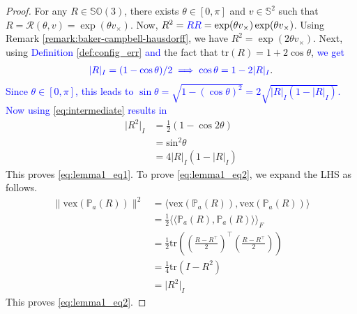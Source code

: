 \documentclass{article}
\newcommand{\SOthree}{\mathbb{SO}(3)}
\newcommand{\vex}[1]{\text{vex}\left(#1\right)}
\newcommand{\trace}[1]{\text{tr}\left(#1\right)}
\newcommand{\brackets}[1]{\left(#1\right)}
\newcommand{\textblue}[1]{\textcolor{blue}{#1}}
\newcommand{\normSOthree}[1]{{{\vert}#1 {\vert}_I}}
\newcommand{\cross}[1]{{#1}_\times}
\newcommand{\frobenius}[2]{\langle\langle #1, #2\rangle\rangle_F}
\newcommand{\inprod}[2]{\langle #1, #2 \rangle}
\begin{document}
\begin{proof}
    For any $R\in\SOthree$, there exists $\theta\in[0,\pi]$ and $v\in\mathbb{S}^2$ such that $R = \mathcal{R}(\theta, v) = \exp(\theta\cross{v})$. Now, $R^2 = \textblue{RR} = \exp(\theta \cross{v})\exp(\theta \cross{v})$. Using Remark \ref{remark:baker-campbell-hausdorff}, we have $R^2 = \exp(2\theta\cross{v})$. Next, using \textblue{Definition \ref{def:config_err} and} the fact that $\trace{R} = 1 + 2\cos\theta$, \textblue{we get} 
    \begin{align}\label{eq:intermediate}
        \textblue{\normSOthree{R} = (1 - \cos\theta)/2 \implies  \textblue{\cos\theta} = 1 - 2\normSOthree{R}}.
    \end{align}
   \textblue{ Since $\theta\in[0,\pi]$, this leads to  $\sin\theta =\sqrt{1-(\cos\theta)^2} = 2\sqrt{\normSOthree{R}\brackets{1 - \normSOthree{R}}}$. Now using \eqref{eq:intermediate} results in}
    \begin{align*}
        \normSOthree{R^2} &= \frac{1}{2}\brackets{1 - \cos{2\theta}} \\
        &= \text{sin}^2{\theta} \nonumber\\
        &= 4\normSOthree{R}\brackets{1 - \normSOthree{R}}
    \end{align*}
    This proves \eqref{eq:lemma1_eq1}. To prove \eqref{eq:lemma1_eq2}, we expand the LHS as follows. 
    \begin{align*}
        \|\vex{\mathbb{P}_a(R)}\|^2 &= \inprod{\vex{\mathbb{P}_a(R)}}{\vex{\mathbb{P}_a(R)}}\\
        &= \frac{1}{2}\frobenius{\mathbb{P}_a(R)}{\mathbb{P}_a(R)}\\
        &= \frac{1}{2}\trace{\brackets{\frac{R - R^\top}{2}}^\top\brackets{\frac{R - R^\top}{2}}}\\
        &= \frac{1}{4}\trace{I - R^2}\\
        &= \normSOthree{R^2}
    \end{align*}
    This proves \eqref{eq:lemma1_eq2}. 
\end{proof}
\end{document}
